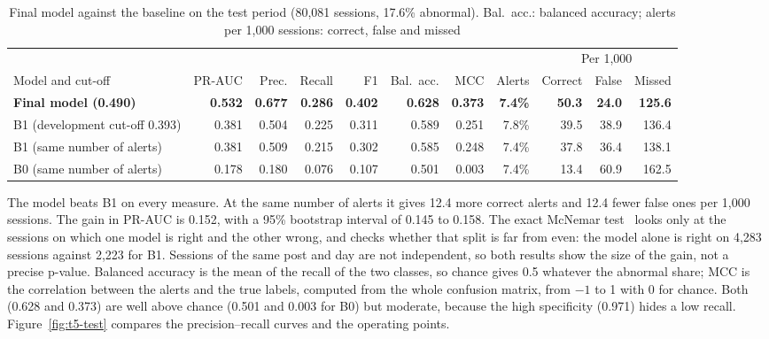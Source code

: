 \documentclass[12pt,a4paper,openany]{report}
\begin{document}
\begin{table}[!htb]
  \centering\scriptsize\setlength{\tabcolsep}{2.5pt}
  \caption[Final model against the baseline on the test period]{Final model against the baseline on the test
  period (80,081 sessions, 17.6\% abnormal). Bal.\ acc.: balanced accuracy; alerts per 1,000 sessions: correct,
  false and missed}
  \label{tab:t5-test}
  \begin{tabular*}{\textwidth}{@{\extracolsep{\fill}}lrrrrrrrrrr@{}}
    \toprule
    & & & & & & & & \multicolumn{3}{c}{Per 1,000} \\
    \cmidrule(l){9-11}
    Model and cut-off & \acs{PR-AUC} & Prec. & Recall & F1 & Bal.\ acc. & \acs{MCC} & Alerts & Correct & False & Missed \\
    \midrule
    \textbf{Final model (0.490)} & \textbf{0.532} & \textbf{0.677} & \textbf{0.286} & \textbf{0.402} & \textbf{0.628} & \textbf{0.373} & \textbf{7.4\%} & \textbf{50.3} & \textbf{24.0} & \textbf{125.6} \\
    B1 (development cut-off 0.393) & 0.381 & 0.504 & 0.225 & 0.311 & 0.589 & 0.251 & 7.8\% & 39.5 & 38.9 & 136.4 \\
    B1 (same number of alerts) & 0.381 & 0.509 & 0.215 & 0.302 & 0.585 & 0.248 & 7.4\% & 37.8 & 36.4 & 138.1 \\
    B0 (same number of alerts) & 0.178 & 0.180 & 0.076 & 0.107 & 0.501 & 0.003 & 7.4\% & 13.4 & 60.9 & 162.5 \\
    \bottomrule
  \end{tabular*}
\end{table}

The model beats B1 on every measure. At the same number of alerts it gives 12.4 more correct alerts and 12.4 fewer
false ones per 1,000 sessions. The gain in \acs{PR-AUC} is 0.152, with a 95\% bootstrap interval of 0.145 to
0.158. The exact McNemar test~\cite{mindd04} looks only at the sessions on which one model is right and the other
wrong, and checks whether that split is far from even: the model alone is right on 4,283 sessions against 2,223 for B1.
Sessions of the same post and day are not independent, so both results show the size of the gain, not a precise
p-value. Balanced accuracy is the mean of the recall of the two classes, so chance gives 0.5 whatever the
abnormal share; \acs{MCC} is the correlation between the alerts and the true labels, computed from the whole
confusion matrix, from $-1$ to 1 with 0 for chance. Both (0.628 and 0.373) are well above chance (0.501 and 0.003 for B0) but
moderate, because the high specificity (0.971) hides a low recall. Figure~\ref{fig:t5-test} compares the
precision--recall curves and the operating points.
\end{document}
